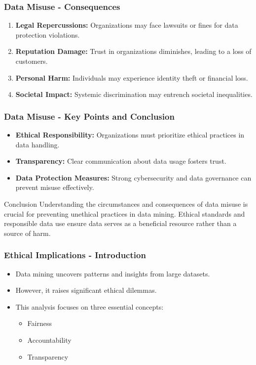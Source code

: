 \documentclass[aspectratio=169]{beamer}
\begin{document}
\begin{frame}[fragile]
    \frametitle{Data Misuse - Consequences}
    \begin{enumerate}
        \item \textbf{Legal Repercussions:} 
              Organizations may face lawsuits or fines for data protection violations.
        \item \textbf{Reputation Damage:} 
              Trust in organizations diminishes, leading to a loss of customers.
        \item \textbf{Personal Harm:} 
              Individuals may experience identity theft or financial loss.
        \item \textbf{Societal Impact:} 
              Systemic discrimination may entrench societal inequalities.
    \end{enumerate}
\end{frame}

\begin{frame}[fragile]
    \frametitle{Data Misuse - Key Points and Conclusion}
    \begin{itemize}
        \item \textbf{Ethical Responsibility:} 
              Organizations must prioritize ethical practices in data handling.
        \item \textbf{Transparency:} 
              Clear communication about data usage fosters trust.
        \item \textbf{Data Protection Measures:} 
              Strong cybersecurity and data governance can prevent misuse effectively.
    \end{itemize}
    
    \begin{block}{Conclusion}
        Understanding the circumstances and consequences of data misuse is crucial for preventing unethical practices in data mining. Ethical standards and responsible data use ensure data serves as a beneficial resource rather than a source of harm.
    \end{block}
\end{frame}

\begin{frame}[fragile]
    \frametitle{Ethical Implications - Introduction}
    \begin{itemize}
        \item Data mining uncovers patterns and insights from large datasets.
        \item However, it raises significant ethical dilemmas.
        \item This analysis focuses on three essential concepts:
        \begin{itemize}
            \item Fairness
            \item Accountability
            \item Transparency
        \end{itemize}
    \end{itemize}
\end{frame}
\end{document}
